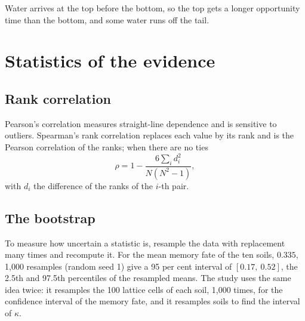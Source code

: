 \sol  Water arrives at the top before the bottom, so the top gets a longer opportunity time than the bottom, and some water runs off the tail.


\chapter{Statistics of the evidence}

\section{Rank correlation}
Pearson's correlation measures straight-line dependence and is sensitive to outliers. Spearman's rank correlation replaces each value by its rank and is the Pearson correlation of the ranks; when there are no ties
\begin{equation}\label{eq:spearman}\boxed{\rho=1-\frac{6\sum_i d_i^{2}}{N(N^{2}-1)},}\end{equation}
with $d_i$ the difference of the ranks of the $i$-th pair.



\section{The bootstrap}
To measure how uncertain a statistic is, resample the data with replacement many times and recompute it. For the mean memory fate of the ten soils, $0.335$, 1,000 resamples (random seed 1) give a 95 per cent interval of $[0.17,\ 0.52]$, the 2.5th and 97.5th percentiles of the resampled means. The study uses the same idea twice: it resamples the 100 lattice cells of each soil, 1,000 times, for the confidence interval of the memory fate, and it resamples soils to find the interval of $\kappa$.

